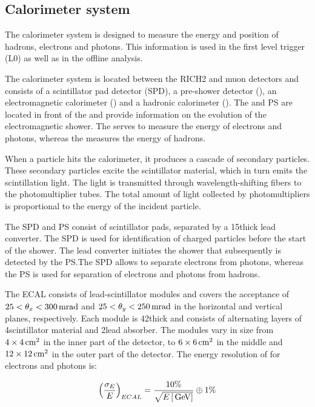 \subsection{Calorimeter system}

The calorimeter system is designed to measure the energy and position of
hadrons, electrons and photons. This information is used in the first level
trigger (L0) as well as in the offline analysis.

The calorimeter system is located between the RICH2 and muon detectors and
consists of a scintillator pad detector (SPD), a pre-shower detector (\presh), an
electromagnetic calorimeter (\ecal) and a hadronic calorimeter (\hcal). The \spd
and PS are located in front of the \ecal and provide information on the
evolution of the electromagnetic shower. The \ecal serves to measure the energy
of electrons and photons, whereas the \hcal measures the energy of hadrons.

When a particle hits the calorimeter, it produces a cascade of secondary
particles. These secondary particles excite the scintillator material, which in
turn emits the scintillation light. The light is transmitted through
wavelength-shifting fibers to the photomultiplier tubes. The total amount of
light collected by photomultipliers is proportional to the energy of the
incident particle.

The SPD and PS consist of scintillator pads, separated by a 15\mm thick lead
converter. The SPD is used for identification of charged particles before the
start of the shower. The lead converter initiates the shower that subsequently
is detected by the PS.\@ The SPD allows to separate electrons from photons,
whereas the PS is used for separation of electrons and photons from hadrons.

The ECAL consists of lead-scintillator modules and covers the acceptance of
$25<\theta_x< 300\rm \,mrad$ and $25 < \theta_y < 250\rm \,mrad$ in the horizontal and
vertical planes, respectively. Each module is 42\mm thick and consists of
alternating layers of 4\mm scintillator material and 2\mm lead absorber. The
modules vary in size from $4\times4\rm \,cm^2$ in the inner part of the detector, to
$6\times6\rm \,cm^2$ in the middle and $12\times12\rm \,cm^2$ in the outer part of the
detector. The energy resolution of \ecal for electrons and photons is: 

\begin{equation}
\left(\frac{\sigma_{E}}{E}\right)_{ECAL} = \frac{10\%}{\sqrt{E\left[\mathrm{\,Ge\kern -0.1em V}\right]}} \oplus 1\%
\label{eqn:ecal}
\end{equation}

